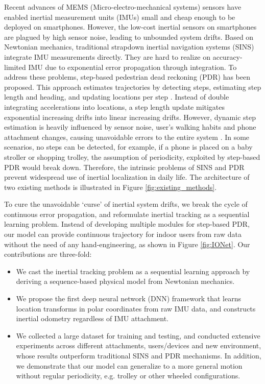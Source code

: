 \documentclass[letterpaper]{article}
\begin{document}
	Recent advances of MEMS (Micro-electro-mechanical systems) sensors have enabled inertial measurement units (IMUs) small and cheap enough to be deployed on smartphones. However, the low-cost inertial sensors on smartphones are plagued by high sensor noise, leading to unbounded system drifts. Based on Newtonian mechanics, traditional strapdown inertial navigation systems (SINS) integrate IMU measurements directly. They are hard to realize on accuracy-limited IMU due to exponential error propagation through integration. To address these problems, step-based pedestrian dead reckoning (PDR) has been proposed. This approach estimates trajectories by detecting steps, estimating step length and heading, and updating locations per step \cite{Li2012a}. Instead of double integrating accelerations into locations, a step length update mitigates exponential increasing drifts into linear increasing drifts. However, dynamic step estimation is heavily influenced by sensor noise, user's walking habits and phone attachment changes, causing unavoidable errors to the entire system \cite{Brajdic2013}. In some scenarios, no steps can be detected, for example, if a phone is placed on a baby stroller or shopping trolley, the assumption of periodicity, exploited by step-based PDR would break down. Therefore, the intrinsic problems of SINS and PDR prevent widespread use of inertial localization in daily life. The architecture of two existing methods is illustrated in Figure \ref{fig:existing_methods}.

    To cure the unavoidable `curse' of inertial system drifts, we break the cycle of continuous error propagation, and reformulate inertial tracking as a sequential learning problem. Instead of developing multiple modules for step-based PDR, our model can provide continuous trajectory for indoor users from raw data without the need of any hand-engineering, as shown in Figure \ref{fig:IONet}. Our contributions are three-fold:
    
\begin{itemize}
\item We cast the inertial tracking problem as a sequential learning approach by deriving a sequence-based physical model from Newtonian mechanics. 

\item We propose the first deep neural network (DNN) framework that learns location transforms in polar coordinates from raw IMU data, and constructs inertial odometry regardless of IMU attachment. 

\item We collected a large dataset for training and testing, and conducted extensive experiments across different attachments, users/devices and new environment, whose results outperform traditional SINS and PDR mechanisms. In addition, we demonstrate that our model can generalize to a more general motion without regular periodicity, e.g. trolley or other wheeled configurations. 
\end{itemize}
\end{document}
